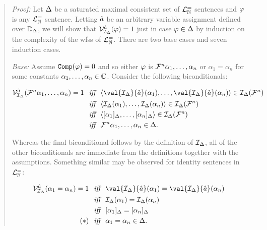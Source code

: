 \begin{quote} 
  \textit{Proof:} 
  Let $\Delta$ be a saturated maximal consistent set of $\mathcal{L}^{=}_{\mathbb{N}}$ sentences and $\varphi$ is any $\mathcal{L}^{=}_{\mathbb{N}}$ sentence.
  Letting $\hat{a}$ be an arbitrary variable assignment defined over $\mathbb{D}_{\Delta}$, we will show that $\mathcal{V}_{\mathcal{I}_{\Delta}}^{\hat{a}}(\varphi)=1$ just in case $\varphi\in\Delta$ by induction on the complexity of the wfss of $\mathcal{L}^{=}_{\mathbb{N}}$.
  There are two base cases and seven induction cases.

  \textit{Base:} 
  Assume $\texttt{Comp}(\varphi)=0$ and so either $\varphi$ is $\mathcal{F}^n\alpha_1,\ldots,\alpha_n$ or $\alpha_1=\alpha_n$ for some constants $\alpha_1,\ldots,\alpha_n\in\mathbb{C}$.
  Consider the following biconditionals:

  \vspace{-.2in}
  \begin{align*}
    \VV{\I_\MetaD}{\va{a}}(\F^n\alpha_1,\ldots,\alpha_n)=1 %
      &\textit{ ~iff~ } \tuple{\val{\I_\MetaD}{\va{a}}(\alpha_1),\ldots,\val{\I_\MetaD}{\va{a}}(\alpha_n)}\in\I_\MetaD(\F^n)\\
      &\textit{ ~iff~ } \tuple{\I_\MetaD(\alpha_1),\ldots,\I_\MetaD(\alpha_n)}\in\I_\MetaD(\F^n)\\
      &\textit{ ~iff~ } \tuple{[\alpha_1]_\MetaD,\ldots,[\alpha_n]_\MetaD}\in\I_\MetaD(\F^n)\\
      &\textit{ ~iff~ } \F^n\alpha_1,\ldots,\alpha_n\in\MetaD.
  \end{align*}

  Whereas the final biconditional follows by the definition of $\mathcal{I}_{\Delta}$, all of the other biconditionals are immediate from the definitions together with the assumptions.
  Something similar may be observed for identity sentences in $\mathcal{L}^{=}_{\mathbb{N}}$:

  \vspace{-.2in}
  \begin{align*}
    \VV{\I_\MetaD}{\va{a}}(\alpha_1=\alpha_n)=1 %
      &\textit{ ~iff~ } \val{\I_\MetaD}{\va{a}}(\alpha_1)=\val{\I_\MetaD}{\va{a}}(\alpha_n)\\
      &\textit{ ~iff~ } \I_\MetaD(\alpha_1)=\I_\MetaD(\alpha_n)\\
      &\textit{ ~iff~ } [\alpha_1]_\MetaD=[\alpha_n]_\MetaD\\
      (\ast) &\textit{ ~iff~ } \alpha_1=\alpha_n\in\MetaD.
  \end{align*}


\end{quote}

